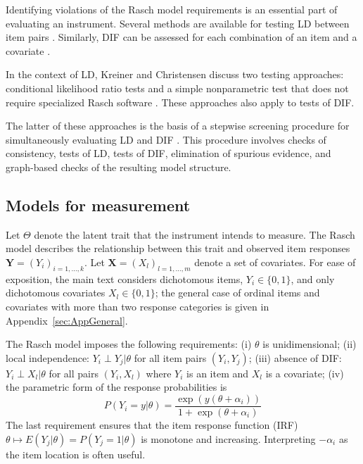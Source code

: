 \documentclass[12pt]{article}
\newcommand{\coauthortodo}[1]{%
  \marginnote{%
    \begin{tcolorbox}[
      width=\marginparwidth,
      colback=yellow!15!white, colframe=orange!70!black,
      colbacktitle=yellow!35!white, coltitle=black,
      title=TODO, fonttitle=\bfseries\scriptsize,
      toptitle=2pt, bottomtitle=2pt,
      fontupper=\scriptsize, boxrule=0.4pt, arc=1mm,
      boxsep=0pt, left=2pt, right=2pt, top=3pt, bottom=3pt,
      before skip=0pt, after skip=0pt
    ]
      \raggedright #1
    \end{tcolorbox}%
  }%
}
\theoremstyle{examplestyle}
\begin{document}
Identifying violations of the Rasch model requirements is an essential part of evaluating an instrument. Several methods are available for testing LD between item pairs \citep[pp. 179-80]{christensen-et-al-2017}. Similarly, DIF can be assessed for each combination of an item and a covariate \citep{zumbo-1999}.

In the context of LD, Kreiner and Christensen \citeyearpar{kreiner-christensen-2012} discuss two testing approaches: conditional likelihood ratio tests \citep{kelderman-1984} and a simple nonparametric test that does not require specialized Rasch software \citep[pp. 1250-1]{kreiner-christensen-2004}. These approaches also apply to tests of DIF.

The latter of these approaches is the basis of a stepwise screening procedure for simultaneously evaluating LD and DIF \citep{kreiner-christensen-2011}. This procedure involves checks of consistency, tests of LD, tests of DIF, elimination of spurious evidence, and graph-based checks of the resulting model structure.

\subsection{Models for measurement}\label{sec:models_measurement}

Let $\Theta$ denote the latent trait that the instrument intends to measure. The Rasch model describes the relationship between this trait and observed item responses $\boldsymbol{Y}=(Y_i)_{i=1,\ldots,k}$. Let $\boldsymbol{X}=(X_l)_{l=1,\ldots,m}$ denote a set of covariates. For ease of exposition, the main text considers dichotomous items, $Y_i\in\{0,1\}$, and only dichotomous covariates $X_l\in\{0,1\}$; the general case of ordinal items and covariates with more than two response categories is given in Appendix~\ref{sec:AppGeneral}. 


The Rasch model imposes the following requirements: (i) $\theta$ is unidimensional; (ii) local independence: $Y_i\perp Y_j|\theta$ for all item pairs $(Y_i,Y_j)$; (iii) absence of DIF: $Y_i\perp X_l|\theta$ for all pairs $(Y_i,X_l)$ where $Y_i$ is an item and $X_l$ is a covariate; (iv) the parametric form of the response probabilities is
$$
P(Y_i=y|\theta)=\frac{\exp(y(\theta+\alpha_{i}))}{1+\exp(\theta+\alpha_{i})}
$$
The last requirement ensures that the item response function (IRF) $\theta\mapsto E(Y_j|\theta)=P(Y_j=1|\theta)$ is monotone and increasing. Interpreting $-\alpha_i$ as the item location is often useful.
\end{document}
